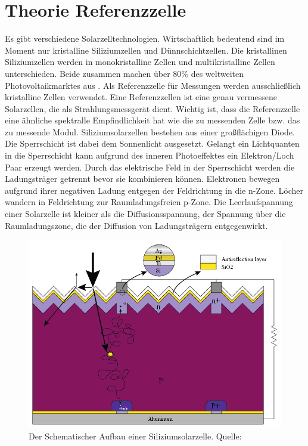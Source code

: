 \documentclass[a4paper,bibtotoc,oneside]{scrbook}
\begin{document}
\section{Theorie Referenzzelle}\thispagestyle{empty}
Es gibt verschiedene Solarzelltechnologien. Wirtschaftlich bedeutend sind im Moment nur kristalline Siliziumzellen und Dünnschichtzellen. Die kristallinen Siliziumzellen werden in monokristalline Zellen und multikristalline Zellen unterschieden. Beide zusammen machen über 80\% des weltweiten Photovoltaikmarktes aus \cite{iea00}. Als Referenzzelle für Messungen werden ausschließlich kristalline Zellen verwendet. Eine Referenzzellen ist eine genau vermessene Solarzellen, die als Strahlungsmessgerät dient. Wichtig ist, dass die Referenzzelle eine ähnliche spektralle Empfindlichkeit hat wie die zu messenden Zelle bzw. das zu messende Modul.
Siliziumsolarzellen bestehen aus einer großflächigen Diode. Die Sperrschicht ist dabei dem Sonnenlicht ausgesetzt. Gelangt ein Lichtquanten in die Sperrschicht kann aufgrund des inneren Photoeffektes ein Elektron/Loch Paar erzeugt werden. Durch das elektrische Feld in der Sperrschicht werden die Ladungsträger getrennt bevor sie kombinieren können. Elektronen bewegen aufgrund ihrer negativen Ladung entgegen der Feldrichtung in die n-Zone. Löcher wandern in Feldrichtung zur Raumladungsfreien p-Zone. Die Leerlaufspannung einer Solarzelle ist kleiner als die Diffusionsspannung, der Spannung über die Raumladungszone, die der Diffusion von Ladungsträgern entgegenwirkt.
\begin{figure}[htbp]
\centering
\includegraphics[width=125mm]{img/cell.png}
\caption{Der Schematischer Aufbau einer Siliziumsolarzelle. Quelle: \cite{cell}}\label{cell}
\end{figure}
\end{document}
